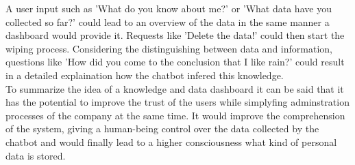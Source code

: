 \documentclass[sigconf, nonacm]{acmart}
\begin{document}
A user input such as 'What do you know about me?' or 'What data have you collected so far?' could lead to an overview of the data in the same manner a dashboard would provide it.
Requests like 'Delete the data!' could then start the wiping process. 
Considering the distinguishing between data and information, questions like 'How did you come to the conclusion that I like rain?' could result in a detailed explaination how the chatbot infered this knowledge.
\\
To summarize the idea of a knowledge and data dashboard it can be said that it has the potential to improve the trust of the users while simplyfing adminstration processes of the company at the same time. 
It would improve the comprehension of the system, giving a human-being control over the data collected by the chatbot and would finally lead to a higher consciousness what kind of personal data is stored.
\end{document}
